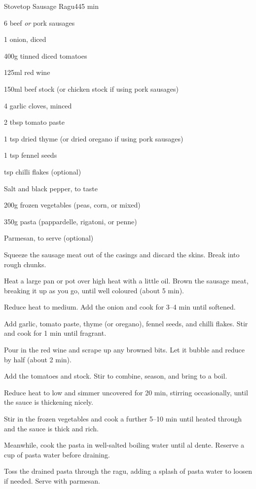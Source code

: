 \begin{recipebox}{Stovetop Sausage Ragu}{4}{45 min}

\begin{ingredients}
  \item 6 beef \textit{or} pork sausages
  \item 1 onion, diced
  \item 400g tinned diced tomatoes
  \item 125ml red wine
  \item 150ml beef stock (or chicken stock if using pork sausages)
  \item 4 garlic cloves, minced
  \item 2 tbsp tomato paste
  \item 1 tsp dried thyme (or dried oregano if using pork sausages)
  \item 1 tsp fennel seeds
  \item {} tsp chilli flakes (optional)
  \item Salt and black pepper, to taste
  \item 200g frozen vegetables (peas, corn, or mixed)
  \item 350g pasta (pappardelle, rigatoni, or penne)
  \item Parmesan, to serve (optional)
\end{ingredients}

\begin{method}
  \item Squeeze the sausage meat out of the casings and discard the skins. Break into rough chunks.
  \item Heat a large pan or pot over high heat with a little oil. Brown the sausage meat, breaking it up as you go, until well coloured (about 5 min).
  \item Reduce heat to medium. Add the onion and cook for 3--4 min until softened.
  \item Add garlic, tomato paste, thyme (or oregano), fennel seeds, and chilli flakes. Stir and cook for 1 min until fragrant.
  \item Pour in the red wine and scrape up any browned bits. Let it bubble and reduce by half (about 2 min).
  \item Add the tomatoes and stock. Stir to combine, season, and bring to a boil.
  \item Reduce heat to low and simmer uncovered for 20 min, stirring occasionally, until the sauce is thickening nicely.
  \item Stir in the frozen vegetables and cook a further 5--10 min until heated through and the sauce is thick and rich.
  \item Meanwhile, cook the pasta in well-salted boiling water until al dente. Reserve a cup of pasta water before draining.
  \item Toss the drained pasta through the ragu, adding a splash of pasta water to loosen if needed. Serve with parmesan.
\end{method}


\end{recipebox}
